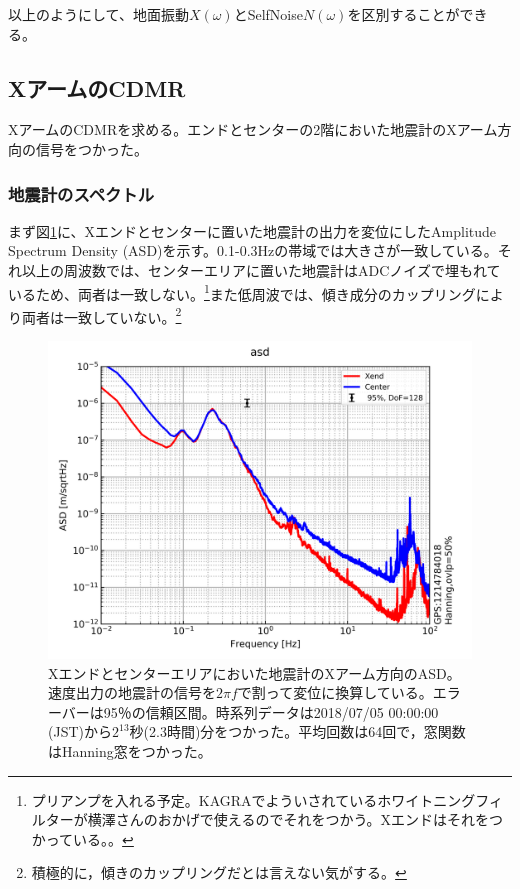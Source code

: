 以上のようにして、地面振動$X(\omega)$とSelfNoise$N(\omega)$を区別することができる。


\subsection{XアームのCDMR}
XアームのCDMRを求める。エンドとセンターの2階においた地震計のXアーム方向の信号をつかった。

\subsubsection{地震計のスペクトル}
まず図\ref{img:img1}に、Xエンドとセンターに置いた地震計の出力を変位にしたAmplitude Spectrum Density (ASD)を示す。0.1-0.3Hzの帯域では大きさが一致している。それ以上の周波数では、センターエリアに置いた地震計はADCノイズで埋もれているため、両者は一致しない。\footnote[6]{プリアンプを入れる予定。KAGRAでよういされているホワイトニングフィルターが横澤さんのおかげで使えるのでそれをつかう。Xエンドはそれをつかっている。。}また低周波では、傾き成分のカップリングにより両者は一致していない。\footnote[7]{積極的に，傾きのカップリングだとは言えない気がする。}

\begin{figure}[H]
  \begin{center}
    \includegraphics[width=11.5cm]{./img_asd_exvixv.png}
  \end{center}
  \caption{Xエンドとセンターエリアにおいた地震計のXアーム方向のASD。速度出力の地震計の信号を$2\pi{f}$で割って変位に換算している。エラーバーは95％の信頼区間。時系列データは2018/07/05 00:00:00 (JST)から$2^{13}$秒(2.3時間)分をつかった。平均回数は64回で，窓関数はHanning窓をつかった。}\label{img:img1}
\end{figure}


